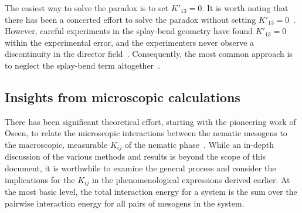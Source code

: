 The easiest way to solve the paradox is to set $K'_{13} = 0$.
It is worth noting that there has been a concerted effort to solve the paradox without setting $K'_{13} = 0$~\cite{RN220,RN221,RN55,RN222}.
However, careful experiments in the splay-bend geometry have found $K'_{13} = 0$ within the experimental error, and the experimenters never observe a discontinuity in the director field~\cite{RN312}.
Consequently, the most common approach is to neglect the splay-bend term altogether~\cite{RN55,RN222}.


\subsection{Insights from microscopic calculations}
There has been significant theoretical effort, starting with the pioneering work of Oseen, to relate the microscopic interactions between the nematic mesogens to the macroscopic, measurable $K_{ij}$ of the nematic phase~\cite{RN56,RN55,RN205,RN217,RN225,RN224,RN218,RN222}.
While an in-depth discussion of the various methods and results is beyond the scope of this document, it is worthwhile to examine the general process and consider the implications for the $K_{ij}$ in the phenomenological expressions derived earlier.
At the most basic level, the total interaction energy for a system is the sum over the pairwise interaction energy for all pairs of mesogens in the system.

